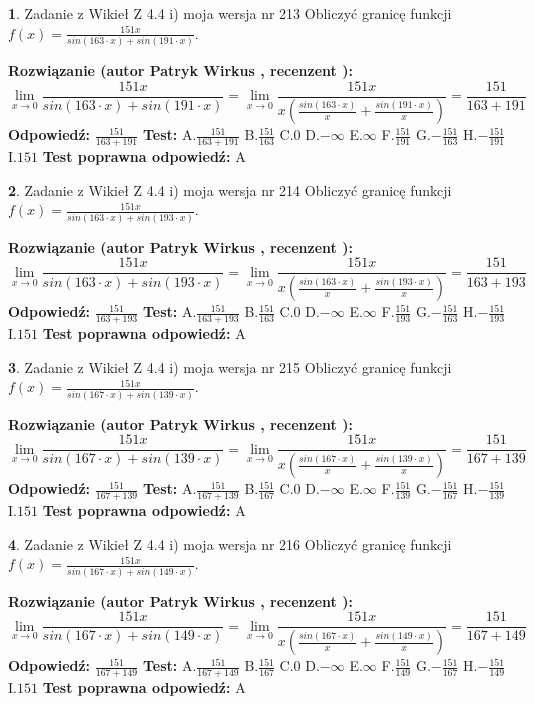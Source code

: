 \documentclass[12pt, a4paper]{article}
\theoremstyle{definition} %
\newtheorem{zad}{}
\newcommand{\zadStart}[1]{\begin{zad}#1\newline}
\newcommand{\zadStop}{\end{zad}}
\newcommand{\rozwStart}[2]{\noindent \textbf{Rozwiązanie (autor #1 , recenzent #2): }\newline}
\newcommand{\rozwStop}{\newline}
\newcommand{\odpStart}{\noindent \textbf{Odpowiedź:}\newline}
\newcommand{\odpStop}{\newline}
\newcommand{\testStart}{\noindent \textbf{Test:}\newline}
\newcommand{\testStop}{\newline}
\newcommand{\kluczStart}{\noindent \textbf{Test poprawna odpowiedź:}\newline}
\newcommand{\kluczStop}{\newline}
\begin{document}
\zadStart{Zadanie z Wikieł Z 4.4 i) moja wersja nr 213}
Obliczyć granicę funkcji $f(x)=\frac{151x}{sin(163\cdot x) +sin(191\cdot x)}$.
\zadStop
\rozwStart{Patryk Wirkus}{}
$$\lim\limits_{x\to 0}\frac{151x}{sin(163\cdot x) +sin(191\cdot x)}=\lim\limits_{x\to 0}\frac{151x}{x(\frac{sin(163\cdot x)}{x}+\frac{sin(191\cdot x)}{x})}=\frac{151}{163+191}$$
\rozwStop
\odpStart
$\frac{151}{163+191}$
\odpStop
\testStart
A.$\frac{151}{163+191}$
B.$\frac{151}{163}$
C.$0$
D.$-\infty$
E.$\infty$
F.$\frac{151}{191}$
G.$-\frac{151}{163}$
H.$-\frac{151}{191}$
I.$151$
\testStop
\kluczStart
A
\kluczStop



\zadStart{Zadanie z Wikieł Z 4.4 i) moja wersja nr 214}
Obliczyć granicę funkcji $f(x)=\frac{151x}{sin(163\cdot x) +sin(193\cdot x)}$.
\zadStop
\rozwStart{Patryk Wirkus}{}
$$\lim\limits_{x\to 0}\frac{151x}{sin(163\cdot x) +sin(193\cdot x)}=\lim\limits_{x\to 0}\frac{151x}{x(\frac{sin(163\cdot x)}{x}+\frac{sin(193\cdot x)}{x})}=\frac{151}{163+193}$$
\rozwStop
\odpStart
$\frac{151}{163+193}$
\odpStop
\testStart
A.$\frac{151}{163+193}$
B.$\frac{151}{163}$
C.$0$
D.$-\infty$
E.$\infty$
F.$\frac{151}{193}$
G.$-\frac{151}{163}$
H.$-\frac{151}{193}$
I.$151$
\testStop
\kluczStart
A
\kluczStop



\zadStart{Zadanie z Wikieł Z 4.4 i) moja wersja nr 215}
Obliczyć granicę funkcji $f(x)=\frac{151x}{sin(167\cdot x) +sin(139\cdot x)}$.
\zadStop
\rozwStart{Patryk Wirkus}{}
$$\lim\limits_{x\to 0}\frac{151x}{sin(167\cdot x) +sin(139\cdot x)}=\lim\limits_{x\to 0}\frac{151x}{x(\frac{sin(167\cdot x)}{x}+\frac{sin(139\cdot x)}{x})}=\frac{151}{167+139}$$
\rozwStop
\odpStart
$\frac{151}{167+139}$
\odpStop
\testStart
A.$\frac{151}{167+139}$
B.$\frac{151}{167}$
C.$0$
D.$-\infty$
E.$\infty$
F.$\frac{151}{139}$
G.$-\frac{151}{167}$
H.$-\frac{151}{139}$
I.$151$
\testStop
\kluczStart
A
\kluczStop



\zadStart{Zadanie z Wikieł Z 4.4 i) moja wersja nr 216}
Obliczyć granicę funkcji $f(x)=\frac{151x}{sin(167\cdot x) +sin(149\cdot x)}$.
\zadStop
\rozwStart{Patryk Wirkus}{}
$$\lim\limits_{x\to 0}\frac{151x}{sin(167\cdot x) +sin(149\cdot x)}=\lim\limits_{x\to 0}\frac{151x}{x(\frac{sin(167\cdot x)}{x}+\frac{sin(149\cdot x)}{x})}=\frac{151}{167+149}$$
\rozwStop
\odpStart
$\frac{151}{167+149}$
\odpStop
\testStart
A.$\frac{151}{167+149}$
B.$\frac{151}{167}$
C.$0$
D.$-\infty$
E.$\infty$
F.$\frac{151}{149}$
G.$-\frac{151}{167}$
H.$-\frac{151}{149}$
I.$151$
\testStop
\kluczStart
A
\kluczStop
\end{document}
